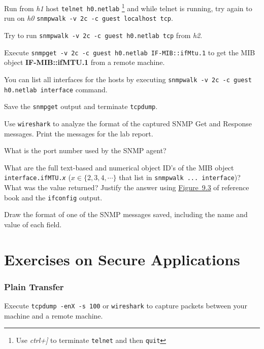 \documentclass{../UTNetLab}
\begin{document}
    Run from \textit{h1} host \lstinline[emph={h0,netlab}]{telnet h0.netlab} \footnote{Use \textit{ctrl+]} to terminate \lstinline{telnet} and then \lstinline{quit}} and while telnet is running, try again to run on \textit{h0}  \lstinline[breaklines=true,escapechar={\ }]{snmpwalk -v 2c -c guest localhost tcp}.

    Try to run \lstinline[emph={h0,netlab,guest},morekeywords={[2]tcp}]{snmpwalk -v 2c -c guest h0.netlab tcp} from \textit{h2}.

    Execute \lstinline[emph={your-host, h0,netlab,guest},morekeywords={[2]IF-MIB,ifMtu}]{snmpget -v 2c -c guest h0.netlab IF-MIB::ifMtu.1} to get the MIB object \textbf{IF-MIB::ifMTU.1} from a remote machine.
    
    You can list all interfaces for the hosts by executing \lstinline[emph={guest,h0,netlab}]{snmpwalk -v 2c -c guest h0.netlab interface} command.

    Save the \lstinline{snmpget} output and terminate \lstinline{tcpdump}.

    Use \lstinline{wireshark} to analyze the format of the captured SNMP Get and Response messages.
    Print the messages for the lab report.
    
    \begin{report}
        \item What is the port number used by the SNMP agent?
        
        \item What are the full text-based and numerical object ID’s of the MIB object \texttt{interface.ifMTU.\textit{x}} ($x \in \{2,3,4,\cdots\}$ that list in \lstinline{snmpwalk ... interface})? What was the value returned? Justify the answer using \hyperref[fig:9.3]{Figure~9.3} of reference book and the \lstinline{ifconfig} output.
        
        \item Draw the format of one of the SNMP messages saved, including the name and value of each field.
    \end{report}

\part{Exercises on Secure Applications}
    
\section{Plain Transfer}
    Execute \lstinline{tcpdump -enX -s 100} or \lstinline{wireshark} to capture packets between your machine and a remote machine.
\end{document}
